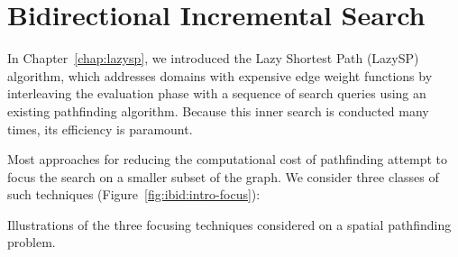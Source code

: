 \chapter{Bidirectional Incremental Search}
\label{chap:ibid}

In Chapter~\ref{chap:lazysp},
we introduced the Lazy Shortest Path (LazySP) algorithm,
which addresses domains with expensive edge weight functions
by interleaving the evaluation phase with a sequence of 
search queries using an existing pathfinding algorithm.
Because this inner search is conducted many times,
its efficiency is paramount.

Most approaches for reducing the computational cost of pathfinding
attempt to focus the search on a smaller subset of the graph.
We consider three classes of such techniques
(Figure~\ref{fig:ibid:intro-focus}):

\begin{marginfigure}[5cm]%
   \centering%
   
   

   \vspace{0.2cm}
   
   \caption{Illustrations of the three focusing techniques considered
      on a spatial pathfinding problem.}%
   \label{fig:ibid:intro-focus}
\end{marginfigure}

